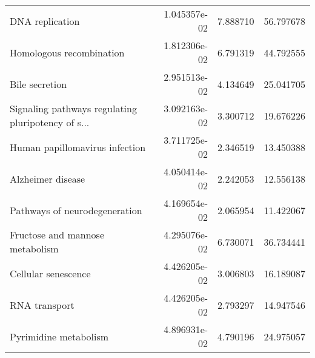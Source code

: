 \begin{tabular}{lrrr}
                                   DNA replication &      1.045357e-02 &  7.888710 &       56.797678 \\
                          Homologous recombination &      1.812306e-02 &  6.791319 &       44.792555 \\
                                    Bile secretion &      2.951513e-02 &  4.134649 &       25.041705 \\
Signaling pathways regulating pluripotency of s... &      3.092163e-02 &  3.300712 &       19.676226 \\
                    Human papillomavirus infection &      3.711725e-02 &  2.346519 &       13.450388 \\
                                 Alzheimer disease &      4.050414e-02 &  2.242053 &       12.556138 \\
                     Pathways of neurodegeneration &      4.169654e-02 &  2.065954 &       11.422067 \\
                   Fructose and mannose metabolism &      4.295076e-02 &  6.730071 &       36.734441 \\
                               Cellular senescence &      4.426205e-02 &  3.006803 &       16.189087 \\
                                     RNA transport &      4.426205e-02 &  2.793297 &       14.947546 \\
                             Pyrimidine metabolism &      4.896931e-02 &  4.790196 &       24.975057 \\
\bottomrule
\end{tabular}
